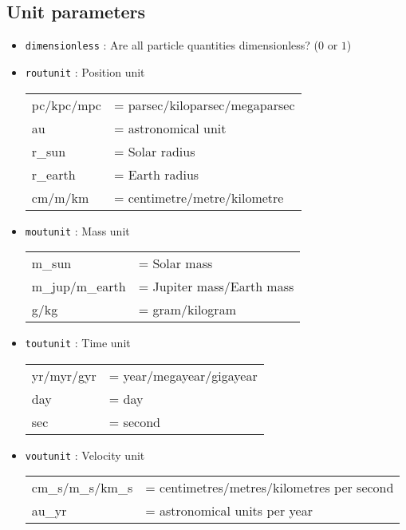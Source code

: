 \documentclass[a4paper]{article}
\newcommand{\var}[1]{\texttt{#1}}
\begin{document}
\subsection{Unit parameters}

\begin{itemize}
\item \var{dimensionless} : Are all particle quantities dimensionless? ($0$ or $1$)

\item \var{routunit} : Position unit \vspace{0.1cm} \\
\begin{tabular}{ll}
pc/kpc/mpc & = parsec/kiloparsec/megaparsec \\
au         & = astronomical unit \\
r\_sun     & = Solar radius \\
r\_earth   & = Earth radius \\
cm/m/km    & = centimetre/metre/kilometre
\end{tabular}

\item \var{moutunit} : Mass unit \vspace{0.1cm} \\
\begin{tabular}{ll}
m\_sun          & = Solar mass \\
m\_jup/m\_earth & = Jupiter mass/Earth mass \\
g/kg            & = gram/kilogram
\end{tabular}


\item \var{toutunit} : Time unit \\
\begin{tabular}{ll}
yr/myr/gyr & = year/megayear/gigayear \\
day        & = day \\
sec        & = second
\end{tabular}

\item \var{voutunit} : Velocity unit \\
\begin{tabular}{ll}
cm\_s/m\_s/km\_s & = centimetres/metres/kilometres per second \\
au\_yr           & = astronomical units per year
\end{tabular}


\end{itemize}
\end{document}
